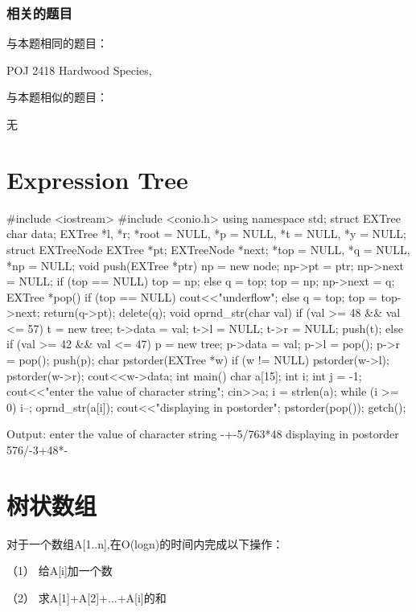 \subsubsection{相关的题目}
与本题相同的题目：
\begindot
\item POJ 2418 Hardwood Species, 
\myenddot

与本题相似的题目：
\begindot
\item 无
\myenddot

\section{Expression Tree} %
\begin{Codex}
	#include <iostream>
	#include <conio.h>
	using namespace std;
	struct EXTree{
		char data;
		EXTree *l, *r;
	}*root = NULL, *p = NULL, *t = NULL, *y = NULL;
	struct EXTreeNode{
		EXTree *pt;
		EXTreeNode *next;
	}*top = NULL, *q = NULL, *np = NULL;
	void push(EXTree *ptr)
	{
		np = new node;
		np->pt = ptr;
		np->next = NULL;
		if (top == NULL)
		{
			top = np;
		}
		else
		{
			q = top;
			top = np;
			np->next = q;
		}
	}
	EXTree *pop()
	{
		if (top == NULL)
		{
			cout<<"underflow\n";
		}
		else
		{
			q = top;
			top = top->next;
			return(q->pt);
			delete(q);
		}
	}
	void oprnd_str(char val)
	{
		if (val >= 48 && val <= 57)
		{
			t = new tree;
			t->data = val;
			t->l = NULL;
			t->r = NULL;
			push(t);
		}
		else if (val >= 42 && val <= 47)
		{
			p = new tree;
			p->data = val;
			p->l = pop();
			p->r = pop();
			push(p);
		}
	}
	char pstorder(EXTree *w)
	{
		if (w != NULL)
		{
			pstorder(w->l);
			pstorder(w->r);
			cout<<w->data;
		}
	}
	int main()
	{
		char a[15];
		int i;
		int j = -1;
		cout<<"enter the value of character string\n";
		cin>>a;
		i = strlen(a);
		while (i >= 0)
		{
			i--;
			oprnd_str(a[i]);
		}
		cout<<"displaying in postorder\n";
		pstorder(pop());
		getch();
	}
	
	
	Output:
	enter the value of character string
	-+-5/763*48
	displaying in postorder
	576/-3+48*-
\end{Codex}

\section{树状数组} %
对于一个数组A[1..n],在O(logn)的时间内完成以下操作：

（1） 给A[i]加一个数

（2） 求A[1]+A[2]+...+A[i]的和

